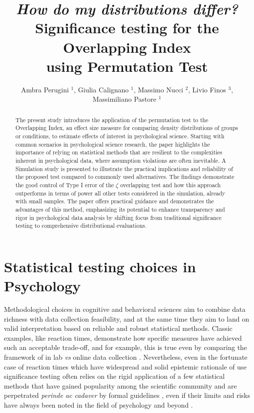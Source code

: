 \documentclass[twocolumn]{article}\usepackage[]{graphicx}\usepackage[]{xcolor}
\begin{document}
\title{\textbf{\textit{How do my distributions differ?} \\ Significance testing for the Overlapping Index \\ using Permutation Test}} %
\author{Ambra Perugini $^1$, Giulia Calignano $^1$, Massimo Nucci $^2$, Livio Finos $^3$, Massimiliano Pastore $^1$}

\maketitle



\begin{abstract}
The present study introduces the application of the permutation test to the Overlapping Index, an effect size measure for comparing density distributions of groups or conditions, to estimate effects of interest in psychological science. Starting with common scenarios in psychological science research, the paper highlights the importance of relying on statistical methods that are resilient to the complexities inherent in psychological data, where assumption violations are often inevitable. A Simulation study is presented to illustrate the practical implications and reliability of the proposed test compared to commonly used alternatives. The findings demonstrate the good control of Type I error of the $\zeta$ overlapping test and how this approach outperforms in terms of power all other tests considered in the simulation, already with small samples. The paper offers practical guidance and demonstrates the advantages of this method, emphasizing its potential to enhance transparency and rigor in psychological data analysis by shifting focus from traditional significance testing to comprehensive distributional evaluations.
\end{abstract}

\section{Statistical testing choices in Psychology}

    Methodological choices in cognitive and behavioral sciences aim to combine data richness with data collection feasibility, and at the same time they aim to land on valid interpretation based on reliable and robust statistical methods. Classic examples, like reaction times, demonstrate how specific measures have achieved such an acceptable trade-off, and for example, this is true even by comparing the framework of in lab \textit{vs} online data collection \cite{semmelmann2017online}. Nevertheless, even in the fortunate case of reaction times which have widespread and solid epistemic rationale of use \cite{grosjean2001timing, proctor2018hick, silverman2010simple} significance testing often relies on the rigid application of a few statistical methods that have gained popularity among the scientific community and are perpetrated \textit{perinde ac cadaver} by formal guidelines \cite{cumming2012statistical}, even if their limits and risks have always been noted in the field of psychology and beyond \cite{boneau1960effects}. 
    
\end{document}
